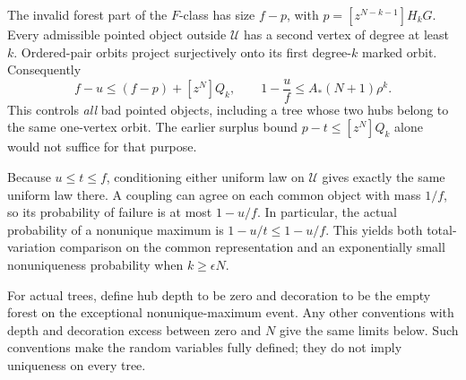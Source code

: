 \documentclass[11pt,letterpaper]{article}
\theoremstyle{definition}\newtheorem{definition}[theorem]{Definition}
\theoremstyle{remark}\newtheorem{remark}[theorem]{Remark}
\begin{document}
The invalid forest part of the $F$-class has size $f-p$, with $p=[z^{N-k-1}]H_kG$. Every admissible pointed object outside $\mathcal U$ has a second vertex of degree at least $k$. Ordered-pair orbits project surjectively onto its first degree-$k$ marked orbit. Consequently
\begin{equation}\label{hod:two:eq:goodset}
f-u\le(f-p)+[z^N]Q_k,\qquad
1-\frac uf\le A_*(N+1)\rho^k.
\end{equation}
This controls \emph{all} bad pointed objects, including a tree whose two hubs belong to the same one-vertex orbit. The earlier surplus bound $p-t\le[z^N]Q_k$ alone would not suffice for that purpose.

Because $u\le t\le f$, conditioning either uniform law on $\mathcal U$ gives exactly the same uniform law there. A coupling can agree on each common object with mass $1/f$, so its probability of failure is at most $1-u/f$. In particular, the actual probability of a nonunique maximum is $1-u/t\le1-u/f$. This yields both total-variation comparison on the common representation and an exponentially small nonuniqueness probability when $k\ge\epsilon N$.

For actual trees, define hub depth to be zero and decoration to be the empty forest on the exceptional nonunique-maximum event. Any other conventions with depth and decoration excess between zero and $N$ give the same limits below. Such conventions make the random variables fully defined; they do not imply uniqueness on every tree.
\end{document}
